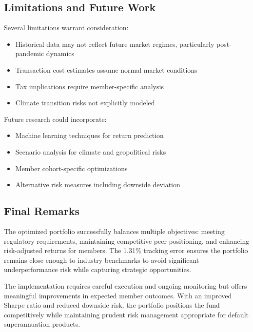 \documentclass[12pt,a4paper]{article}
\begin{document}
\subsection{Limitations and Future Work}

Several limitations warrant consideration:

\begin{itemize}
    \item Historical data may not reflect future market regimes, particularly post-pandemic dynamics
    \item Transaction cost estimates assume normal market conditions
    \item Tax implications require member-specific analysis
    \item Climate transition risks not explicitly modeled
\end{itemize}

Future research could incorporate:
\begin{itemize}
    \item Machine learning techniques for return prediction
    \item Scenario analysis for climate and geopolitical risks
    \item Member cohort-specific optimizations
    \item Alternative risk measures including downside deviation
\end{itemize}

\subsection{Final Remarks}

The optimized portfolio successfully balances multiple objectives: meeting regulatory requirements, maintaining competitive peer positioning, and enhancing risk-adjusted returns for members. The 1.31\% tracking error ensures the portfolio remains close enough to industry benchmarks to avoid significant underperformance risk while capturing strategic opportunities.

The implementation requires careful execution and ongoing monitoring but offers meaningful improvements in expected member outcomes. With an improved Sharpe ratio and reduced downside risk, the portfolio positions the fund competitively while maintaining prudent risk management appropriate for default superannuation products.



\end{document}
